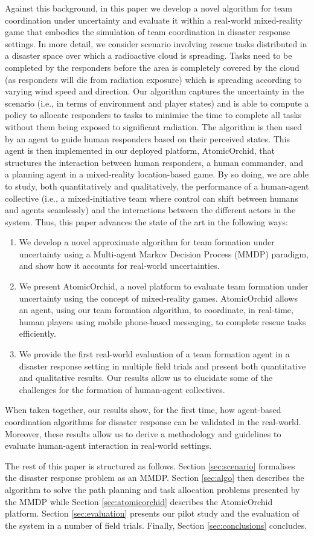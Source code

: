 Against this background, in this paper we develop a novel algorithm for team coordination under uncertainty and evaluate it within a real-world mixed-reality game that embodies the simulation of team coordination in disaster response settings. In more detail, we consider scenario involving rescue tasks distributed in a disaster space over which a radioactive cloud is spreading. Tasks need to be completed by the responders before the area is completely covered by the cloud (as responders will die from radiation exposure) which is spreading according to varying wind speed and direction. Our algorithm captures the uncertainty in the scenario (i.e., in terms of environment and player states) and  is able to compute a policy to allocate responders to tasks to minimise the time to complete all tasks without them being exposed to significant radiation. The algorithm is then used by an agent to guide human responders based on their perceived states. This agent is then implemented in our deployed platform, AtomicOrchid, that structures the interaction between human responders, a human commander, and a planning agent in a mixed-reality location-based game. By so doing, we are able to study, both quantitatively and qualitatively, the performance of a human-agent collective (i.e., a mixed-initiative team where control can shift between humans and agents seamlessly)  and the interactions between the different actors in the system. Thus, this paper advances the state of the art in the following ways:
\begin{enumerate}
\item We develop a novel approximate algorithm for team formation under uncertainty using a Multi-agent Markov Decision Process (MMDP) paradigm, and show how it accounts for real-world uncertainties.
\item We present AtomicOrchid, a novel platform to evaluate team formation under uncertainty using the concept of mixed-reality games. AtomicOrchid allows an agent, using our team formation algorithm, to coordinate, in real-time, human players using mobile phone-based messaging, to complete rescue tasks efficiently.
\item We provide the first real-world evaluation of a team formation agent in a disaster response setting in multiple field trials and present both quantitative and qualitative results. Our results allow us to elucidate some of the challenges for the formation of human-agent collectives.
\end{enumerate}
When taken together, our results show, for the first time, how agent-based coordination algorithms for disaster response can be validated in the real-world. Moreover, these results allow us to derive a methodology and guidelines to evaluate human-agent interaction in real-world settings. 

The rest of this paper is structured as follows. Section \ref{sec:scenario} formalises the disaster response problem as an MMDP. Section \ref{sec:algo} then describes the algorithm to solve the path planning and task allocation problems presented by the MMDP while Section \ref{sec:atomicorchid} describes the AtomicOrchid platform. Section \ref{sec:evaluation} presents our pilot study and the evaluation of the system in a number of field trials.  Finally, Section \ref{sec:conclusions} concludes.